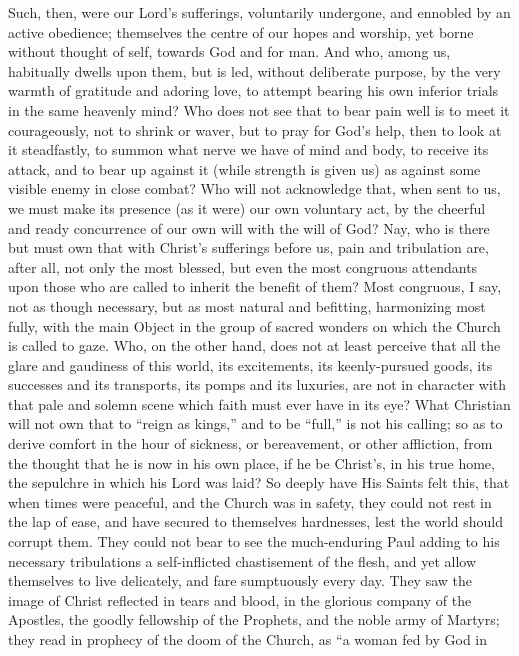 Such, then, were our Lord's sufferings, voluntarily undergone, and
ennobled by an active obedience; themselves the centre of our hopes
and worship, yet borne without thought of self, towards God and for
man. And who, among us, habitually dwells upon them, but is led,
without deliberate purpose, by the very warmth of gratitude and
adoring love, to attempt bearing his own inferior trials in the same
heavenly mind? Who does not see that to bear pain well is to meet it
courageously, not to shrink or waver, but to pray for God's help, then
to look at it steadfastly, to summon what nerve we have of mind and
body, to receive its attack, and to bear up against it (while strength
is given us) as against some visible enemy in close combat? Who will
not acknowledge that, when sent to us, we must make its presence (as
it were) our own voluntary act, by the cheerful and ready concurrence
of our own will with the will of God? Nay, who is there but must own
that with Christ's sufferings before us, pain and tribulation are,
after all, not only the most blessed, but even the most congruous
attendants upon those who are called to inherit the benefit of them?
Most congruous, I say, not as though necessary, but as most natural
and befitting, harmonizing most fully, with the main Object in the
group of sacred wonders on which the Church is called to gaze. Who, on
the other hand, does not at least perceive that all the glare and
gaudiness of this world, its excitements, its keenly-pursued goods,
its successes and its transports, its pomps and its luxuries, are not
in character with that pale and solemn scene which faith must ever
have in its eye? What Christian will not own that to ``reign as
kings,'' and to be ``full,'' is not his calling; so as to
derive comfort in the hour of sickness, or bereavement, or other
affliction, from the thought that he is now in his own place, if he be
Christ's, in his true home, the sepulchre in which his Lord was laid?
So deeply have His Saints felt this, that when times were peaceful,
and the Church was in safety, they could not rest in the lap of ease,
and have secured to themselves hardnesses, lest the world should
corrupt them. They could not bear to see the much-enduring Paul adding
to his necessary tribulations a self-inflicted chastisement of the
flesh, and yet allow themselves to live delicately, and fare
sumptuously every day. They saw the image of Christ reflected in tears
and blood, in the glorious company of the Apostles, the goodly
fellowship of the Prophets, and the noble army of Martyrs; they read
in prophecy of the doom of the Church, as ``a woman fed by God in
